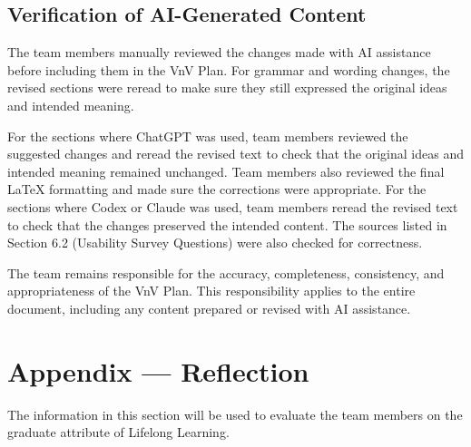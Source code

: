 \documentclass[12pt, titlepage]{article}
\begin{document}
\subsection{Verification of AI-Generated Content}
The team members manually reviewed the changes made with AI assistance before including them in the VnV Plan. For grammar and wording changes, the revised sections were reread to make sure they still expressed the original ideas and intended meaning.

\medskip\noindent
For the sections where ChatGPT was used, team members reviewed the suggested changes and reread the revised text to check that the original ideas and intended meaning remained unchanged. Team members also reviewed the final LaTeX formatting and made sure the corrections were appropriate. For the sections where Codex or Claude was used, team members reread the revised text to check that the changes preserved the intended content. The sources listed in Section 6.2 (Usability Survey Questions) were also checked for correctness.

\medskip\noindent
The team remains responsible for the accuracy, completeness, consistency, and appropriateness of the VnV Plan. This responsibility applies to the entire document, including any content prepared or revised with AI assistance.

\newpage{}

\section{Appendix --- Reflection}


The information in this section will be used to evaluate the team members on the
graduate attribute of Lifelong Learning.


\end{document}
